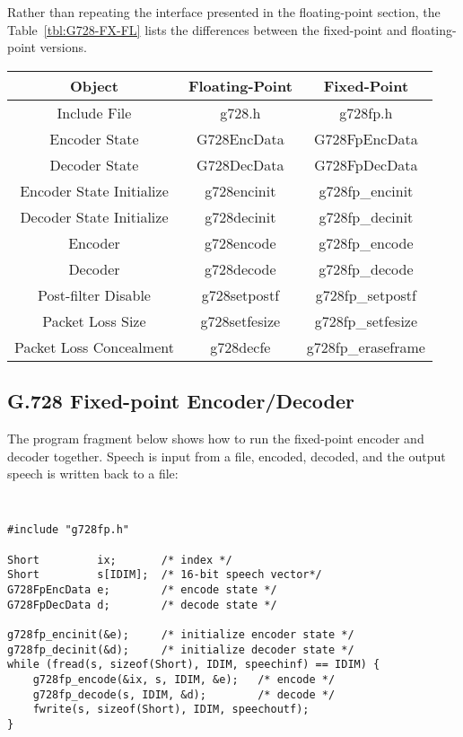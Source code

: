 Rather than repeating the interface presented in the floating-point section,
the Table~\ref{tbl:G728-FX-FL} lists the differences between the fixed-point and floating-point versions.

\begin{table}[th]

\begin{center}
\begin{tabular} { | c | c | c | }
 \hline
Object & Floating-Point & Fixed-Point \\ \hline
Include File & g728.h & g728fp.h \\ \hline
Encoder State & G728EncData & G728FpEncData \\ \hline
Decoder State & G728DecData & G728FpDecData \\ \hline
Encoder State Initialize & g728encinit & g728fp\_encinit \\ \hline
Decoder State Initialize & g728decinit & g728fp\_decinit \\ \hline
Encoder & g728encode & g728fp\_encode \\ \hline
Decoder & g728decode & g728fp\_decode \\ \hline
Post-filter Disable & g728setpostf & g728fp\_setpostf \\ \hline
Packet Loss Size & g728setfesize & g728fp\_setfesize \\ \hline
Packet Loss Concealment & g728decfe & g728fp\_eraseframe \\ \hline
\end{tabular}
\end{center}
\end{table}

\subsection {G.728 Fixed-point Encoder/Decoder}

The program fragment below shows how to run the fixed-point encoder and
decoder together. Speech is input from a file, encoded, decoded, and
the output speech is written back to a file:

{\tt\small
\begin{verbatim}
#include "g728fp.h"

Short         ix;       /* index */
Short         s[IDIM];  /* 16-bit speech vector*/
G728FpEncData e;        /* encode state */
G728FpDecData d;        /* decode state */

g728fp_encinit(&e);     /* initialize encoder state */
g728fp_decinit(&d);     /* initialize decoder state */
while (fread(s, sizeof(Short), IDIM, speechinf) == IDIM) {
    g728fp_encode(&ix, s, IDIM, &e);   /* encode */
    g728fp_decode(s, IDIM, &d);        /* decode */
    fwrite(s, sizeof(Short), IDIM, speechoutf);
}
\end{verbatim}
}

